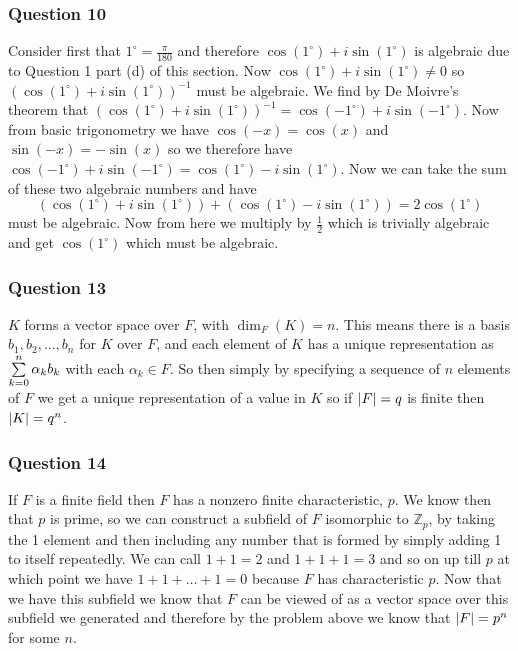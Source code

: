 \documentclass{article}
\begin{document}
\subsubsection{Question 10}
Consider first that $1^\circ = \frac{\pi}{180}$ and therefore $\cos(1^\circ)+i\sin(1^\circ) $ is algebraic due to Question 1 part (d) of this section. Now $\cos(1^\circ)+i\sin(1^\circ)\not=0$ so $\left(\cos(1^\circ)+i\sin(1^\circ)\right)^{-1}$ must be algebraic. We find by De Moivre's theorem that $\left(\cos(1^\circ)+i\sin(1^\circ)\right)^{-1} = \cos(-1^\circ)+i\sin(-1^\circ)$. Now from basic trigonometry we have $\cos(-x) = \cos(x)$ and $\sin(-x) = -\sin(x)$ so we therefore have $\cos(-1^\circ)+i\sin(-1^\circ) = \cos(1^\circ) -i\sin(1^\circ)$. Now we can take the sum of these two algebraic numbers and have $$\left(\cos(1^\circ)+i\sin(1^\circ)\right)+\left(\cos(1^\circ)-i\sin(1^\circ)\right) = 2\cos(1^\circ)$$ must be algebraic. Now from here we multiply by $\frac 12$ which is trivially algebraic and get $\cos(1^\circ)$ which must be algebraic.


\subsubsection{Question 13}
$K$ forms a vector space over $F$, with $\dim_F(K) = n$. This means there is a basis $b_1,b_2,\ldots,b_n$ for $K$ over $F$, and each element of $K$ has a unique representation as $\sum\limits_{k=0}^{n}  {\alpha_k b_k} $ with each $\alpha_k \in F$. So then simply by specifying a sequence of $n$ elements of $F$ we get a unique representation of a value in $K$ so if $\left| {F} \right| = q$ is finite then $\left| {K} \right| = q^n$.


\subsubsection{Question 14}

If $F$ is a finite field then $F$ has a nonzero finite characteristic, $p$. We know then that $p$ is prime, so we can construct a subfield of $F$ isomorphic to $\mathbb Z_p$, by taking the 1 element and then including any number that is formed by simply adding 1 to itself repeatedly. We can call $1+1 = 2$ and $1+1+1 = 3$ and so on up till $p$ at which point we have $1+1+\ldots+1 = 0$ because $F$ has characteristic $p$. Now that we have this subfield we know that $F$ can be viewed of as a vector space over this subfield we generated and therefore by the problem above we know that $\left| {F} \right| = p^n$ for some $n$.
\end{document}
